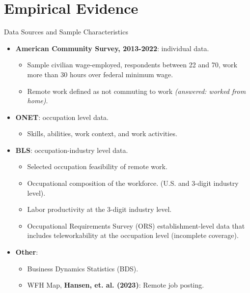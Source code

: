 \documentclass[aspectratio=1610]{beamer}
\begin{document}
\section{Empirical Evidence}

\begin{frame}{Data Sources and Sample Characteristics}
    \begin{itemize}
        \item \textbf{American Community Survey, 2013-2022}: individual data.
        \begin{itemize}
            \item Sample civilian wage-employed, respondents between 22 and 70, work more than 30 hours over federal minimum wage.
            \item Remote work defined as not commuting to work \textit{(answered: worked from home)}.
        \end{itemize} \pause \vspace{0.3cm}
        \item \textbf{ONET}: occupation level data.
        \begin{itemize}
            \item Skills, abilities, work context, and work activities.
        \end{itemize}\pause \vspace{0.3cm}
        \item \textbf{BLS}: occupation-industry level data.
        \begin{itemize}
            \item Selected occupation feasibility of remote work.
            \item Occupational composition of the workforce. (U.S. and 3-digit industry level).
            \item Labor productivity at the 3-digit industry level.
            \item Occupational Requirements Survey (ORS) establishment-level data that includes teleworkability at the occupation level (incomplete coverage).
        \end{itemize}\pause \vspace{0.3cm}
        \item \textbf{Other}:
        \begin{itemize}
            \item Business Dynamics Statistics (BDS).
            \item WFH Map, \textbf{Hansen, et. al. (2023)}: Remote job posting.
        \end{itemize}
    \end{itemize}
\end{frame}
\end{document}
